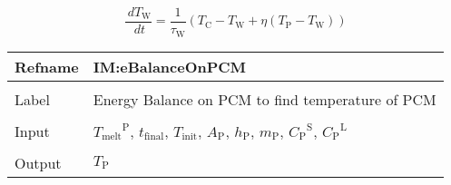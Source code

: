 \documentclass[12pt]{article}
\begin{document}
\begin{displaymath}
\frac{\,d{T_{\text{W}}}}{\,dt}=\frac{1}{{τ_{\text{W}}}} \left({T_{\text{C}}}-{T_{\text{W}}}+η \left({T_{\text{P}}}-{T_{\text{W}}}\right)\right)
\end{displaymath}
\vspace{\baselineskip}
\noindent
\begin{minipage}{\textwidth}
\begin{tabular}{>{\raggedright}p{}>{\raggedright\arraybackslash}p{}}
\toprule \textbf{Refname} & \textbf{IM:eBalanceOnPCM}
\label{IM:eBalanceOnPCM}
\\ \midrule \\
Label & Energy Balance on PCM to find temperature of PCM
        
\\ \midrule \\
Input & ${{T_{\text{melt}}}^{\text{P}}}$, ${t_{\text{final}}}$, ${T_{\text{init}}}$, ${A_{\text{P}}}$, ${h_{\text{P}}}$, ${m_{\text{P}}}$, ${{C_{\text{P}}}^{\text{S}}}$, ${{C_{\text{P}}}^{\text{L}}}$
        
\\ \midrule \\
Output & ${T_{\text{P}}}$
         

\end{tabular}
\end{minipage}
\end{document}
